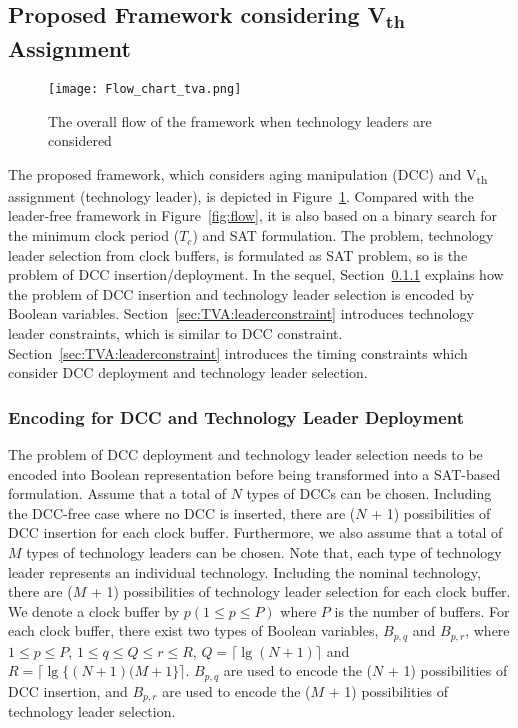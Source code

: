 \subsection{Proposed Framework considering V\textsubscript{th} Assignment}
\label{sec:TVA:framework}
\begin{figure}
	\centering
	\texttt{[image: Flow\_chart\_tva.png]}
	\caption{The overall flow of the framework when technology leaders are considered }
	\label{fig:flow:tva}
\end{figure}
The proposed framework, which considers aging manipulation (DCC) and V\textsubscript{th} assignment (technology leader), is depicted in Figure~\ref{fig:flow:tva}. Compared with the leader-free framework in Figure~\ref{fig:flow}, it is also based on a binary search for the minimum clock period ($T_c$) and SAT formulation. The problem, technology leader selection from clock buffers, is formulated as SAT problem, so is the problem of DCC insertion/deployment. In the sequel, Section~\ref{sec:TVA:leader_encode} explains how the problem of DCC insertion and technology leader selection is encoded by Boolean variables. Section~\ref{sec:TVA:leaderconstraint} introduces technology leader constraints, which is similar to DCC constraint. Section~\ref{sec:TVA:leaderconstraint} introduces the timing constraints which consider DCC deployment and technology leader selection.

\subsubsection{Encoding for DCC and Technology Leader Deployment}
\label{sec:TVA:leader_encode}
The problem of DCC deployment and technology leader selection needs to be encoded into Boolean representation before being transformed into a SAT-based formulation. Assume that a total of $N$ types of DCCs can be chosen. Including the DCC-free case where no DCC is inserted, there are ($N$ + 1) possibilities of DCC insertion for each clock buffer. Furthermore, we also assume that a total of $M$ types of technology leaders can be chosen. Note that, each type of technology leader represents an individual technology. Including the nominal technology, there are ($M$ + 1) possibilities of technology leader selection for each clock buffer. We denote a clock buffer by $p\left(1 \leq p \leq P\right)$ where $P$ is the number of buffers. For each clock buffer, there exist two types of Boolean variables, $B_{p,q}$ and $B_{p,r}$, where $1 \leq p \leq P$, $1 \leq q \leq Q \leq r \leq R$, $Q = \lceil \lg (N + 1)\rceil$ and $R = \lceil \lg \{(N + 1)(M + 1\}\rceil$. $B_{p,q}$ are used to encode the ($N$ + 1) possibilities of DCC insertion, and $B_{p,r}$ are used to encode the ($M$ + 1) possibilities of technology leader selection.


